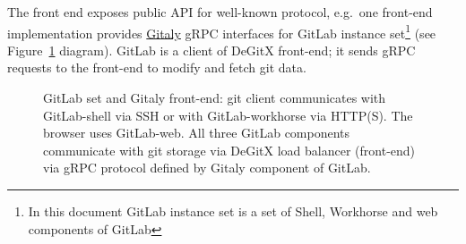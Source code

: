 \documentclass[acmlarge, screen, nonacm, 11pt]{acmart}
\begin{document}
The front end exposes public API for well-known protocol, e.g.\ one front-end implementation provides
\href{https://docs.gitlab.com/ee/administration/gitaly/}{Gitaly} gRPC interfaces for GitLab
instance set\footnote{In this document GitLab instance set is a set of Shell, Workhorse and web components of GitLab}
(see Figure~\ref{fig:gitlab-set} diagram). GitLab is a client of DeGitX front-end; it sends gRPC requests to the
front-end to modify and fetch git data.

\begin{figure}
  \begin{center}
  \end{center}
  \caption{
    GitLab set and Gitaly front-end:
    git client communicates with GitLab-shell via SSH or with GitLab-workhorse via HTTP(S).
    The browser uses GitLab-web. All three GitLab components communicate with git storage via DeGitX load balancer
    (front-end) via gRPC protocol defined by Gitaly component of GitLab.
  }\label{fig:gitlab-set}
\end{figure}
\end{document}
